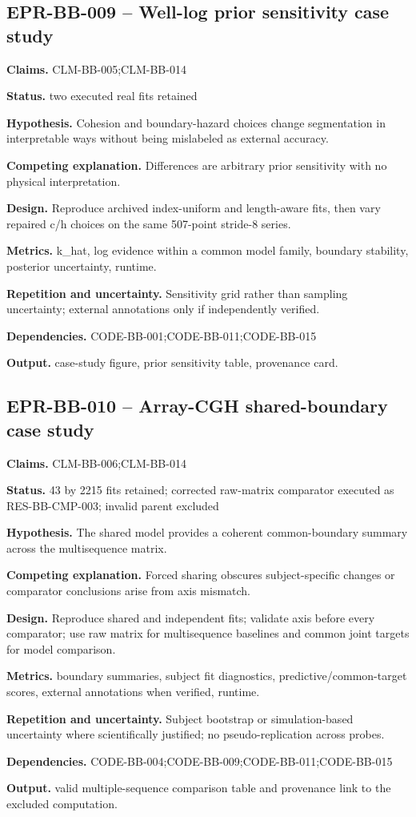 \subsection{EPR-BB-009 -- Well-log prior sensitivity case study}
\textbf{Claims.} CLM-BB-005;CLM-BB-014\par
\textbf{Status.} two executed real fits retained\par
\textbf{Hypothesis.} Cohesion and boundary-hazard choices change segmentation in interpretable ways without being mislabeled as external accuracy.\par
\textbf{Competing explanation.} Differences are arbitrary prior sensitivity with no physical interpretation.\par
\textbf{Design.} Reproduce archived index-uniform and length-aware fits, then vary repaired c/h choices on the same 507-point stride-8 series.\par
\textbf{Metrics.} k\_hat, log evidence within a common model family, boundary stability, posterior uncertainty, runtime.\par
\textbf{Repetition and uncertainty.} Sensitivity grid rather than sampling uncertainty; external annotations only if independently verified.\par
\textbf{Dependencies.} CODE-BB-001;CODE-BB-011;CODE-BB-015\par
\textbf{Output.} case-study figure, prior sensitivity table, provenance card.

\subsection{EPR-BB-010 -- Array-CGH shared-boundary case study}
\textbf{Claims.} CLM-BB-006;CLM-BB-014\par
\textbf{Status.} 43 by 2215 fits retained; corrected raw-matrix comparator executed as RES-BB-CMP-003; invalid parent excluded\par
\textbf{Hypothesis.} The shared model provides a coherent common-boundary summary across the multisequence matrix.\par
\textbf{Competing explanation.} Forced sharing obscures subject-specific changes or comparator conclusions arise from axis mismatch.\par
\textbf{Design.} Reproduce shared and independent fits; validate axis before every comparator; use raw matrix for multisequence baselines and common joint targets for model comparison.\par
\textbf{Metrics.} boundary summaries, subject fit diagnostics, predictive/common-target scores, external annotations when verified, runtime.\par
\textbf{Repetition and uncertainty.} Subject bootstrap or simulation-based uncertainty where scientifically justified; no pseudo-replication across probes.\par
\textbf{Dependencies.} CODE-BB-004;CODE-BB-009;CODE-BB-011;CODE-BB-015\par
\textbf{Output.} valid multiple-sequence comparison table and provenance link to the excluded computation.

